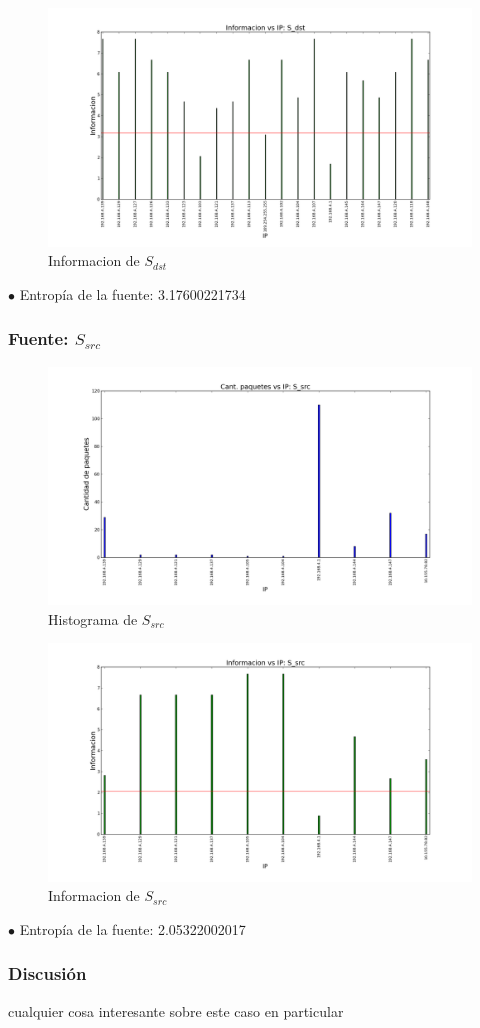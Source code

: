 \begin{figure}[H]\centering
    \includegraphics[width=0.8\linewidth]{../imgs/red-honeywell_S_dst_info.png}
    \caption{Informacion de $S_{dst}$}\label{fig:Honeywell-dst-info}
\end{figure}

$\bullet$ Entropía de la fuente: 3.17600221734

\subsubsection{Fuente: $S_{src}$}

\begin{figure}[H]\centering
    \includegraphics[width=0.8\linewidth]{../imgs/red-honeywell_S_src_hist.png}
    \caption{Histograma de $S_{src}$}\label{fig:Honeywell-src-hist}
\end{figure}

\begin{figure}[H]\centering
    \includegraphics[width=0.8\linewidth]{../imgs/red-honeywell_S_src_info.png}
    \caption{Informacion de $S_{src}$}\label{fig:Honeywell-src-info}
\end{figure}

$\bullet$ Entropía de la fuente: 2.05322002017

\subsubsection{Discusión}

cualquier cosa interesante sobre este caso en particular
